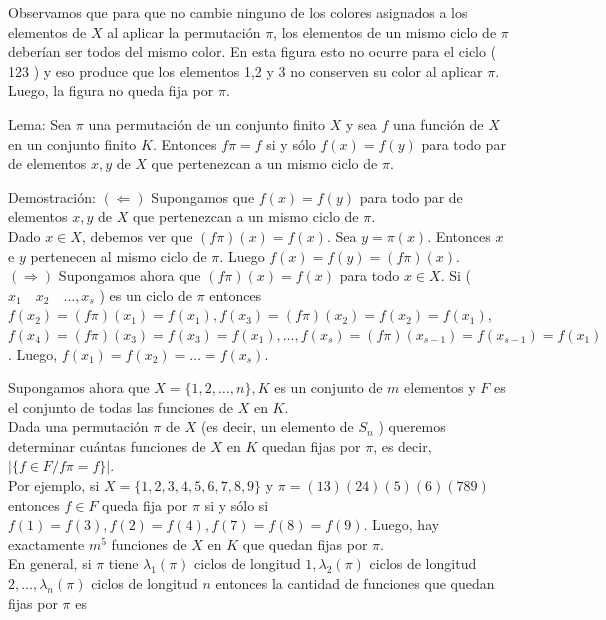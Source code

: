 \documentclass[10pt]{article}
\begin{document}
Observamos que para que no cambie ninguno de los colores asignados a los elementos de $X$ al aplicar la permutación $\pi$, los elementos de un mismo ciclo de $\pi$ deberían ser todos del mismo color. En esta figura esto no ocurre para el ciclo ( 123 ) y eso produce que los elementos 1,2 y 3 no conserven su color al aplicar $\pi$. Luego, la figura no queda fija por $\pi$.

Lema: Sea $\pi$ una permutación de un conjunto finito $X$ y sea $f$ una función de $X$ en un conjunto finito $K$. Entonces $f \pi=f$ si y sólo $f(x)=f(y)$ para todo par de elementos $x, y$ de $X$ que pertenezcan a un mismo ciclo de $\pi$.

Demostración: $(\Leftarrow)$ Supongamos que $f(x)=f(y)$ para todo par de elementos $x, y$ de $X$ que pertenezcan a un mismo ciclo de $\pi$.\\
Dado $x \in X$, debemos ver que $(f \pi)(x)=f(x)$. Sea $y=\pi(x)$. Entonces $x$ e $y$ pertenecen al mismo ciclo de $\pi$. Luego $f(x)=f(y)=(f \pi)(x)$.\\
$(\Rightarrow)$ Supongamos ahora que $(f \pi)(x)=f(x)$ para todo $x \in X$. Si ( $x_{1} \quad x_{2} \quad \ldots, x_{s}$ ) es un ciclo de $\pi$ entonces $f\left(x_{2}\right)=(f \pi)\left(x_{1}\right)=f\left(x_{1}\right), f\left(x_{3}\right)=(f \pi)\left(x_{2}\right)=f\left(x_{2}\right)=f\left(x_{1}\right)$, $f\left(x_{4}\right)=(f \pi)\left(x_{3}\right)=f\left(x_{3}\right)=f\left(x_{1}\right), \ldots, f\left(x_{s}\right)=(f \pi)\left(x_{s-1}\right)=f\left(x_{s-1}\right)=f\left(x_{1}\right)$. Luego, $f\left(x_{1}\right)=f\left(x_{2}\right)=\ldots=f\left(x_{s}\right)$.

Supongamos ahora que $X=\{1,2, \ldots, n\}, K$ es un conjunto de $m$ elementos y $F$ es el conjunto de todas las funciones de $X$ en $K$.\\
Dada una permutación $\pi$ de $X$ (es decir, un elemento de $S_{n}$ ) queremos determinar cuántas funciones de $X$ en $K$ quedan fijas por $\pi$, es decir, $|\{f \in F / f \pi=f\}|$.\\
Por ejemplo, si $X=\{1,2,3,4,5,6,7,8,9\}$ y $\pi=(13)(24)(5)(6)(789)$ entonces $f \in F$ queda fija por $\pi$ si y sólo si $f(1)=f(3), f(2)=f(4), f(7)=f(8)=f(9)$. Luego, hay exactamente $m^{5}$ funciones de $X$ en $K$ que quedan fijas por $\pi$.\\
En general, si $\pi$ tiene $\lambda_{1}(\pi)$ ciclos de longitud $1, \lambda_{2}(\pi)$ ciclos de longitud $2, \ldots, \lambda_{n}(\pi)$ ciclos de longitud $n$ entonces la cantidad de funciones que quedan fijas por $\pi$ es
\end{document}
